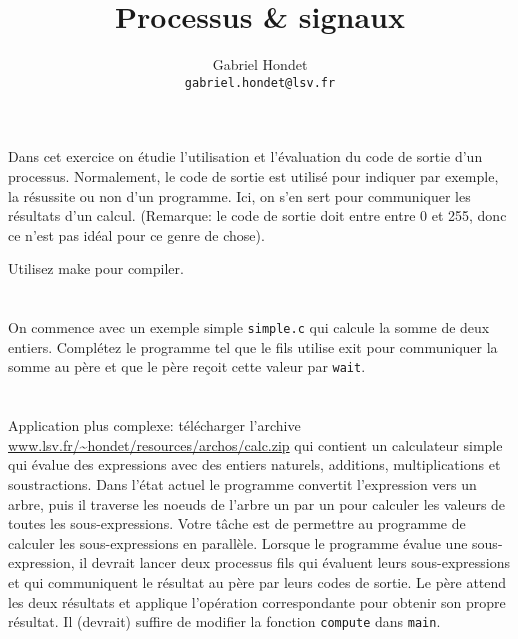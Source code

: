 \documentclass{exam}
\title{Processus \& signaux}
\author{Gabriel Hondet\\\texttt{gabriel.hondet@lsv.fr}}
\date{}
\begin{document}
\maketitle

\begin{questions}

  \question{}
  Dans cet exercice on étudie l’utilisation et l’évaluation du code de sortie d’un
  processus. Normalement, le code de sortie est utilisé pour indiquer par exemple,
  la résussite ou non d’un programme. Ici, on s’en sert pour communiquer les
  résultats d’un calcul. (Remarque: le code de sortie doit entre entre 0 et 255,
  donc ce n’est pas idéal pour ce genre de chose).

  Utilisez make pour compiler.

  \begin{parts}
    \part{}
    On commence avec un exemple simple \texttt{simple.c} qui calcule la
    somme de deux entiers. Complétez le programme tel que le fils utilise exit
    pour communiquer la somme au père et que le père reçoit cette valeur par
    \texttt{wait}.


    \part{}
    Application plus complexe: télécharger l’archive
    \url{www.lsv.fr/~hondet/resources/archos/calc.zip} qui
    contient un calculateur simple qui évalue des expressions avec des entiers
    naturels, additions, multiplications et soustractions. Dans l’état actuel le
    programme convertit l’expression vers un arbre, puis il traverse les noeuds de
    l’arbre un par un pour calculer les valeurs de toutes les sous-expressions.
    Votre tâche est de permettre au programme de calculer les sous-expressions en
    parallèle. Lorsque le programme évalue une sous-expression, il devrait lancer
    deux processus fils qui évaluent leurs sous-expressions et qui communiquent le
    résultat au père par leurs codes de sortie. Le père attend les deux résultats
    et applique l’opération correspondante pour obtenir son propre résultat. Il
    (devrait) suffire de modifier la fonction \texttt{compute} dans
    \texttt{main}.
    \end{parts}


\end{questions}
\end{document}
